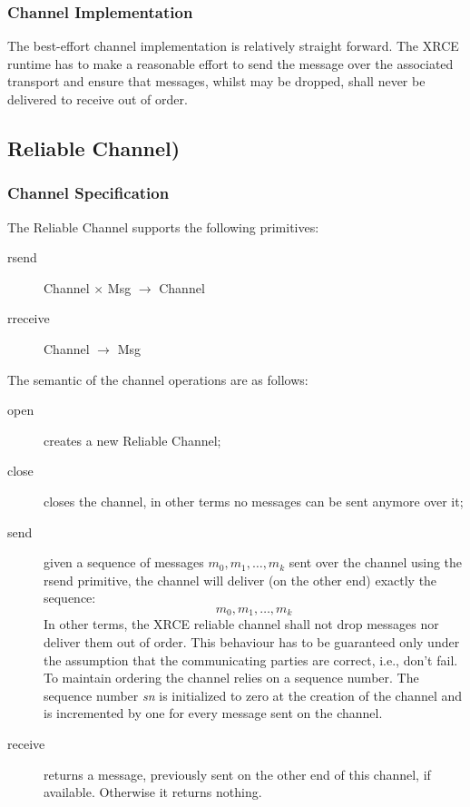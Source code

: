\documentclass[a4paper,oneside,article]{memoir}
\begin{document}
\subsubsection{Channel Implementation}

The best-effort channel implementation is relatively straight forward. The XRCE runtime has to make
a reasonable effort to send the message over the associated transport and ensure that messages,
whilst may be dropped, shall never be delivered to receive out of order.

\subsection{Reliable Channel)}

\subsubsection{Channel Specification}
The Reliable Channel supports the following primitives:
\begin{description}
\item[rsend] Channel $\times$ Msg $\rightarrow$ Channel
\item[rreceive] Channel $\rightarrow$ Msg
\end{description}
The semantic of the channel operations are as follows:
\begin{description}
\item[open] creates a new Reliable Channel;
\item[close] closes the channel, in other terms no messages can be sent anymore over it;
\item[send] given a sequence of messages $m_0, m_1, \ldots{}, m_k$ sent over the channel using the
  rsend primitive, the channel will deliver (on the other end) exactly the sequence:
  \[
    m_0, m_1, \ldots{}, m_k
  \]
  In other terms, the XRCE reliable channel shall not drop messages nor deliver them out of order.
  This behaviour has to be guaranteed only under the assumption that the communicating parties are
  correct, i.e., don't fail.  To maintain ordering the channel relies on a sequence number.  The
  sequence number \emph{sn} is initialized to zero at the creation of the channel and is incremented
  by one for every message sent on the channel.
\item[receive] returns a message, previously sent on the other end of this channel, if
  available.  Otherwise it returns nothing.
\end{description}  
\end{document}
